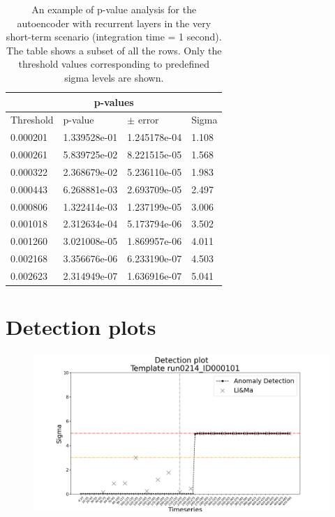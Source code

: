 \begin{table}[!h]
\centering
\begin{tabular}{|p{3cm}|p{3cm}|p{3cm}|p{3cm}|}
\hline
\multicolumn{4}{|c|}{p-values} \\
\hline
Threshold & p-value & $\pm$ error &  Sigma \\
\hline
  0.000201 & 1.339528e-01 & 1.245178e-04 &  1.108 \\
  0.000261 & 5.839725e-02 & 8.221515e-05 &  1.568 \\
  0.000322 & 2.368679e-02 & 5.236110e-05 &  1.983 \\
  0.000443 & 6.268881e-03 & 2.693709e-05 &  2.497 \\
  0.000806 & 1.322414e-03 & 1.237199e-05 &  3.006 \\
  0.001018 & 2.312634e-04 & 5.173794e-06 &  3.502 \\
  0.001260 & 3.021008e-05 & 1.869957e-06 &  4.011 \\
  0.002168 & 3.356676e-06 & 6.233190e-07 &  4.503 \\
  0.002623 & 2.314949e-07 & 1.636916e-07 &  5.041 \\
\hline
\end{tabular}
\caption{An example of p-value analysis for the autoencoder with recurrent layers in the very short-term scenario (integration time = 1 second). The table shows a subset of all the rows. Only the threshold values corresponding to predefined sigma levels are shown.}
\label{tab:p-value-table-rnn-itime-1-appendix}
\end{table}



\section{Detection plots}
\label{s:appendix-c}

\begin{figure}[!htb]
    \includegraphics[width=1\textwidth]{figures/experiments/detection_plots/detection_plot_run0214_ID000101_testset_e.png}
\end{figure}
    
